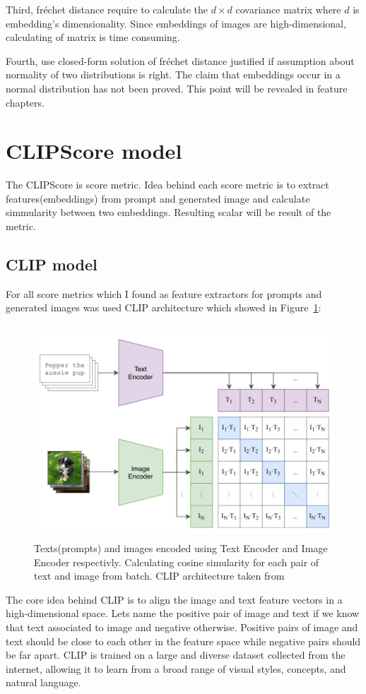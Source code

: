 Third, fréchet distance require to calculate the $d \times d$ covariance matrix where $d$ is embedding's dimensionality. Since embeddings of images are high-dimensional, calculating of matrix is time consuming.

Fourth, use closed-form solution of fréchet distance justified if assumption about normality of two distributions is right. The claim that embeddings occur in a normal distribution has not been proved. This point will be revealed in feature chapters.

\section{CLIPScore model}
The CLIPScore is score metric. Idea behind each score metric is to extract features(embeddings) from prompt and generated image and calculate simmularity between two embeddings. Resulting scalar will be result of the metric.
\subsection{CLIP model}
For all score metrics which I found as feature extractors for prompts and generated images was used CLIP architecture \cite{CLIP} which showed in Figure~\ref{fig:CLIP}:
\begin{figure}[hbt]
\centering
\includegraphics[width=12cm, height=8cm]{figs/clip.png}
\caption{Texts(prompts) and images encoded using Text Encoder and Image Encoder respectivly. Calculating cosine simularity for each pair of text and image from batch. CLIP architecture taken from \cite{CLIP}}
\label{fig:CLIP}
\end{figure}


The core idea behind CLIP is to align the image and text feature vectors in a high-dimensional space. Lets name the positive pair of image and text if we know that text associated to image and negative otherwise. Positive pairs of image and text should be close to each other in the feature space while negative pairs should be far apart. CLIP is trained on a large and diverse dataset collected from the internet, allowing it to learn from a broad range of visual styles, concepts, and natural language.


